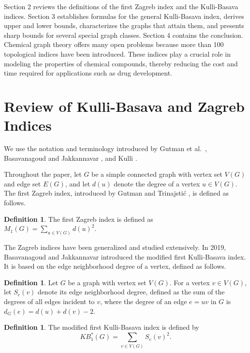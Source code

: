 \documentclass[11pt, oneside]{amsart}   	%
\theoremstyle{definition}
\newtheorem{definition}[theorem]{Definition}
\theoremstyle{remark}
\numberwithin{equation}{section}
\begin{document}
Section 2 reviews the definitions of the first Zagreb index and the Kulli-Basava indices. Section 3 establishes formulas for the general Kulli-Basava index, derives upper and lower bounds, characterizes the graphs that attain them, and presents sharp bounds for several special graph classes. Section 4 contains the conclusion. Chemical graph theory offers many open problems because more than 100 topological indices have been introduced. These indices play a crucial role in modeling the properties of chemical compounds, thereby reducing the cost and time required for applications such as drug development.


\section{Review of Kulli-Basava and Zagreb Indices}

We use the notation and terminology introduced by Gutman et al.\ \cite{gutman2007alkanes}, Basavanagoud and Jakkannavar \cite{basavanagoud2019kulli}, and Kulli \cite{VK2019, VK2022, kulli2019multiplicative}.


Throughout the paper, let $G$ be a simple connected graph with vertex set $V(G)$ and edge set $E(G)$, and let $d(u)$ denote the degree of a vertex $u\in V(G)$. The first Zagreb index, introduced by Gutman and Trinajsti\'{c} \cite{gutman1972graph}, is defined as follows.

\begin{definition} The first Zagreb index is defined as $M_1(G)=\sum_{u\in V(G)}d(u)^2.$
\end{definition}

The Zagreb indices have been generalized and studied extensively. In 2019, Basavanagoud and Jakkannavar \cite{basavanagoud2019kulli} introduced the modified first Kulli-Basava index. It is based on the edge neighborhood degree of a vertex, defined as follows.

\begin{definition} Let $G$ be a graph with vertex set $V(G)$. For a vertex $v\in V(G)$, let $S_e(v)$ denote its edge neighborhood degree, defined as the sum of the degrees of all edges incident to $v$, where the degree of an edge $e=uv$ in $G$ is $d_G(e)=d(u)+d(v)-2$.
\end{definition}

\begin{definition} The modified first Kulli-Basava index is defined by
    \[KB_1^*(G)=\sum_{v\in V(G)} S_e(v)^2.\]
\end{definition}
\end{document}
